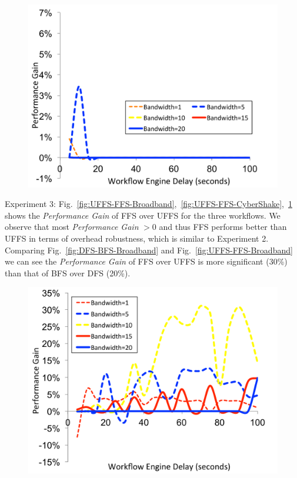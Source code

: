 \documentclass[final]{IEEEtran}
\begin{document}
\begin{figure}[!htb]
\centering
 \includegraphics[width=0.9\linewidth]{figure/UFFS-FFS-Montage.pdf}
  \label{fig:UFFS-FFS-Montage}
  \vspace{-10pt}
\end{figure}



Experiment 3: Fig.~\ref{fig:UFFS-FFS-Broadband},~\ref{fig:UFFS-FFS-CyberShake},~\ref{fig:UFFS-FFS-Montage} shows the \emph{Performance Gain} of FFS over UFFS for the three workflows. We observe that most  \emph{Performance Gain} $>0$ and thus FFS performs better than UFFS in terms of overhead robustness, which is similar to Experiment 2. Comparing Fig.~\ref{fig:DFS-BFS-Broadband} and Fig.~\ref{fig:UFFS-FFS-Broadband} we can see the \emph{Performance Gain} of FFS over UFFS is more significant (30\%) than that of BFS over DFS (20\%).  
\begin{figure}[!htb]
\centering
 \includegraphics[width=0.9\linewidth]{figure/UIFS-IFS-Broadband.pdf}
  \label{fig:UIFS-IFS-Broadband}
  \vspace{-10pt}
\end{figure}
\end{document}

